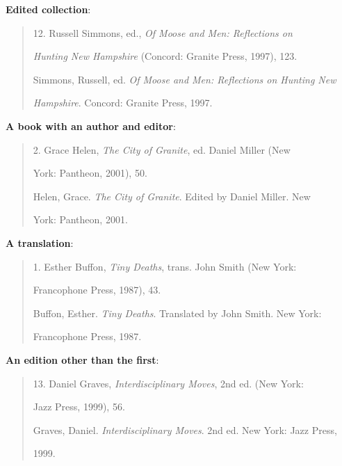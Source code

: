 \textbf{Edited collection}:
\begin{quote}
 \hspace{.4in}12. Russell Simmons, ed., \emph{Of Moose and Men: Reflections on}

\emph{Hunting New Hampshire} (Concord: Granite Press, 1997), 123.

\medskip

Simmons, Russell, ed. \emph{Of Moose and Men: Reflections on Hunting New}
  
\hspace{.4in}\emph{Hampshire}. Concord: Granite Press, 1997.
\end{quote}

\textbf{A book with an author and editor}:

\begin{quote}
 \hspace{.4in}2. Grace Helen, \emph{The City of Granite}, ed. Daniel Miller (New 

York: Pantheon, 2001), 50.

\medskip

Helen, Grace. \emph{The City of Granite}. Edited by Daniel Miller. New 

\hspace{.4in}York: Pantheon, 2001.
\end{quote}

\textbf{A translation}:
\begin{quote}

\hspace{.4in}1. Esther Buffon, \emph{Tiny Deaths}, trans. John Smith (New York: 

Francophone Press, 1987), 43.

\medskip

Buffon, Esther. \emph{Tiny Deaths}. Translated by John Smith. New York:  

\hspace{.4in}Francophone Press, 1987.
\end{quote}


\textbf{An edition other than the first}:

\begin{quote}
 \hspace{.4in}13. Daniel Graves, \emph{Interdisciplinary Moves}, 2nd ed. (New York: 
 
Jazz Press, 1999), 56.

\medskip

Graves, Daniel. \emph{Interdisciplinary Moves}. 2nd ed. New York: Jazz Press,

\hspace{.4in}1999.
\end{quote}

